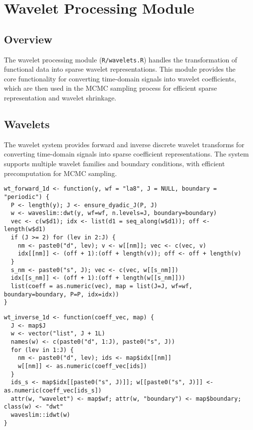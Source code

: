 \documentclass[11pt]{article}
\begin{document}
\section{Wavelet Processing Module}

\subsection{Overview}

The wavelet processing module (\texttt{R/wavelets.R}) handles the transformation of functional data into sparse wavelet representations. This module provides the core functionality for converting time-domain signals into wavelet coefficients, which are then used in the MCMC sampling process for efficient sparse representation and wavelet shrinkage.

\subsection{Wavelets}

The wavelet system provides forward and inverse discrete wavelet transforms for converting time-domain signals into sparse coefficient representations. The system supports multiple wavelet families and boundary conditions, with efficient precomputation for MCMC sampling.

\begin{lstlisting}
wt_forward_1d <- function(y, wf = "la8", J = NULL, boundary = "periodic") {
  P <- length(y); J <- ensure_dyadic_J(P, J)
  w <- waveslim::dwt(y, wf=wf, n.levels=J, boundary=boundary)
  vec <- c(w$d1); idx <- list(d1 = seq_along(w$d1)); off <- length(w$d1)
  if (J >= 2) for (lev in 2:J) {
    nm <- paste0("d", lev); v <- w[[nm]]; vec <- c(vec, v)
    idx[[nm]] <- (off + 1):(off + length(v)); off <- off + length(v)
  }
  s_nm <- paste0("s", J); vec <- c(vec, w[[s_nm]])
  idx[[s_nm]] <- (off + 1):(off + length(w[[s_nm]]))
  list(coeff = as.numeric(vec), map = list(J=J, wf=wf, boundary=boundary, P=P, idx=idx))
}
\end{lstlisting}

\begin{lstlisting}
wt_inverse_1d <- function(coeff_vec, map) {
  J <- map$J
  w <- vector("list", J + 1L)
  names(w) <- c(paste0("d", 1:J), paste0("s", J))
  for (lev in 1:J) {
    nm <- paste0("d", lev); ids <- map$idx[[nm]]
    w[[nm]] <- as.numeric(coeff_vec[ids])
  }
  ids_s <- map$idx[[paste0("s", J)]]; w[[paste0("s", J)]] <- as.numeric(coeff_vec[ids_s])
  attr(w, "wavelet") <- map$wf; attr(w, "boundary") <- map$boundary; class(w) <- "dwt"
  waveslim::idwt(w)
}
\end{lstlisting}
\end{document}
